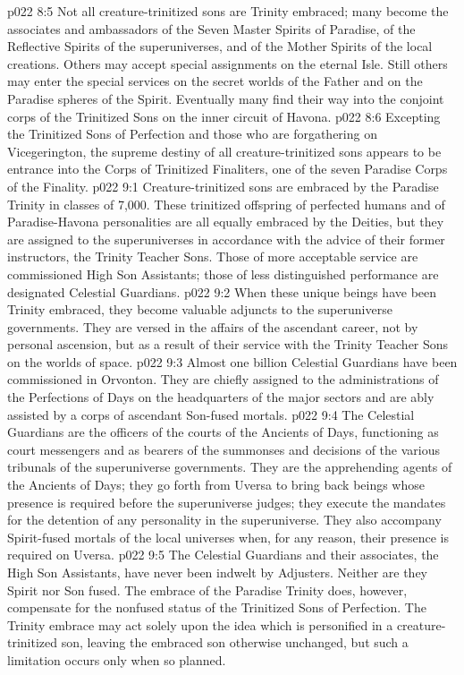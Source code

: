 \vs p022 8:5 Not all creature\hyp{}trinitized sons are Trinity embraced; many become the associates and ambassadors of the Seven Master Spirits of Paradise, of the Reflective Spirits of the superuniverses, and of the Mother Spirits of the local creations. Others may accept special assignments on the eternal Isle. Still others may enter the special services on the secret worlds of the Father and on the Paradise spheres of the Spirit. Eventually many find their way into the conjoint corps of the Trinitized Sons on the inner circuit of Havona.
\vs p022 8:6 Excepting the Trinitized Sons of Perfection and those who are forgathering on Vicegerington, the supreme destiny of all creature\hyp{}trinitized sons appears to be entrance into the Corps of Trinitized Finaliters, one of the seven Paradise Corps of the Finality.
\vs p022 9:1 Creature\hyp{}trinitized sons are embraced by the Paradise Trinity in classes of 7,000. These trinitized offspring of perfected humans and of Paradise\hyp{}Havona personalities are all equally embraced by the Deities, but they are assigned to the superuniverses in accordance with the advice of their former instructors, the Trinity Teacher Sons. Those of more acceptable service are commissioned High Son Assistants; those of less distinguished performance are designated Celestial Guardians.
\vs p022 9:2 When these unique beings have been Trinity embraced, they become valuable adjuncts to the superuniverse governments. They are versed in the affairs of the ascendant career, not by personal ascension, but as a result of their service with the Trinity Teacher Sons on the worlds of space.
\vs p022 9:3 \pc Almost one billion Celestial Guardians have been commissioned in Orvonton. They are chiefly assigned to the administrations of the Perfections of Days on the headquarters of the major sectors and are ably assisted by a corps of ascendant Son\hyp{}fused mortals.
\vs p022 9:4 The Celestial Guardians are the officers of the courts of the Ancients of Days, functioning as court messengers and as bearers of the summonses and decisions of the various tribunals of the superuniverse governments. They are the apprehending agents of the Ancients of Days; they go forth from Uversa to bring back beings whose presence is required before the superuniverse judges; they execute the mandates for the detention of any personality in the superuniverse. They also accompany Spirit\hyp{}fused mortals of the local universes when, for any reason, their presence is required on Uversa.
\vs p022 9:5 \pc The Celestial Guardians and their associates, the High Son Assistants, have never been indwelt by Adjusters. Neither are they Spirit nor Son fused. The embrace of the Paradise Trinity does, however, compensate for the nonfused status of the Trinitized Sons of Perfection. The Trinity embrace may act solely upon the idea which is personified in a creature\hyp{}trinitized son, leaving the embraced son otherwise unchanged, but such a limitation occurs only when so planned.
